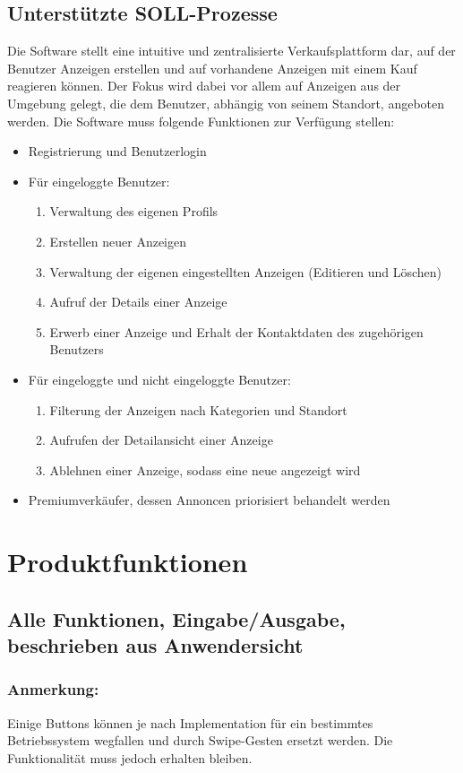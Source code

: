 \documentclass[a4paper,12pt,oneside]{scrartcl}
\begin{document}
\subsection{Unterstützte SOLL-Prozesse}
Die Software stellt eine intuitive und zentralisierte Verkaufsplattform dar, auf der Benutzer Anzeigen erstellen und auf vorhandene Anzeigen mit einem Kauf reagieren können.
Der Fokus wird dabei vor allem auf Anzeigen aus der Umgebung gelegt, die dem Benutzer, abhängig von seinem Standort, angeboten werden.
Die Software muss folgende Funktionen zur Verfügung stellen:
\begin{itemize}
	\item Registrierung und Benutzerlogin
	\item Für eingeloggte Benutzer:
	\begin{enumerate}
		\item Verwaltung des eigenen Profils
		\item Erstellen neuer Anzeigen
		\item Verwaltung der eigenen eingestellten Anzeigen (Editieren und Löschen)
		\item Aufruf der Details einer Anzeige
		\item Erwerb einer Anzeige und Erhalt der Kontaktdaten des zugehörigen Benutzers
	\end{enumerate}
	\item Für eingeloggte und nicht eingeloggte Benutzer:
	\begin{enumerate}
		\item Filterung der Anzeigen nach Kategorien und Standort
		\item Aufrufen der Detailansicht einer Anzeige
		\item Ablehnen einer Anzeige, sodass eine neue angezeigt wird
	\end{enumerate}
	\item Premiumverkäufer, dessen Annoncen priorisiert behandelt werden
\end{itemize}




\section{Produktfunktionen}
\subsection{Alle Funktionen, Eingabe/Ausgabe, beschrieben aus Anwendersicht}

\subsubsection*{Anmerkung:}
Einige Buttons können je nach Implementation für ein bestimmtes Betriebssystem wegfallen und durch Swipe-Gesten ersetzt werden.
Die Funktionalität muss jedoch erhalten bleiben.
\end{document}
